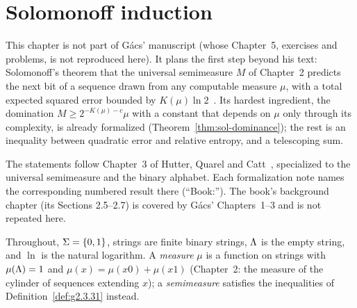 %

\setcounter{chapter}{5}
\chapter{Solomonoff induction}

This chapter is not part of G\'acs' manuscript (whose Chapter~5, exercises and problems,
is not reproduced here). It plans the first step beyond his text: Solomonoff's theorem
that the universal semimeasure \( M \) of Chapter~2 predicts the next bit of a sequence
drawn from any computable measure \( \mu \), with a total expected squared error bounded
by \( K(\mu) \ln 2 \)~\cite{Solomonoff78,Hutter05}. Its hardest ingredient, the domination
\( M \ge 2^{-K(\mu)-c}\mu \) with a constant that depends on \( \mu \) only through its
complexity, is already formalized (Theorem~\ref{thm:sol-dominance}); the rest is an
inequality between quadratic error and relative entropy, and a telescoping sum.

The statements follow Chapter~3 of Hutter, Quarel and Catt~\cite{HutterQuarelCatt24},
specialized to the universal semimeasure and the binary alphabet. Each formalization note
names the corresponding numbered result there (``Book:''). The book's background chapter
(its Sections 2.5--2.7) is covered by G\'acs' Chapters~1--3 and is not repeated here.

Throughout, \( \Sigma = \{0,1\} \), strings are finite binary strings, \( \Lambda \) is the empty
string, and \( \ln \) is the natural logarithm. A \emph{measure} \( \mu \) is a function on
strings with \( \mu(\Lambda) = 1 \) and \( \mu(x) = \mu(x0) + \mu(x1) \) (Chapter~2: the
measure of the cylinder of sequences extending \( x \)); a \emph{semimeasure} satisfies
the inequalities of Definition~\ref{def:g2.3.31} instead.

